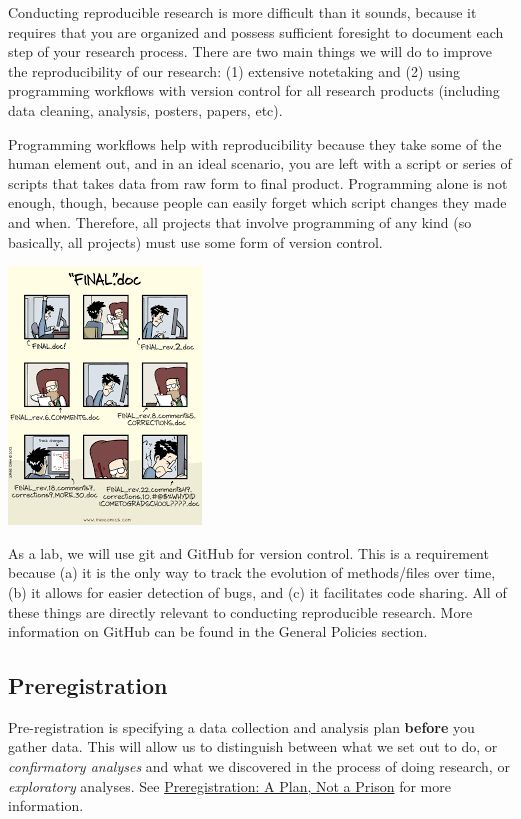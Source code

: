 \documentclass[]{book}
\begin{document}
Conducting reproducible research is more difficult than it sounds, because it requires that you are organized and possess sufficient foresight to document each step of your research process. There are two main things we will do to improve the reproducibility of our research: (1) extensive notetaking and (2) using programming workflows with version control for all research products (including data cleaning, analysis, posters, papers, etc).

Programming workflows help with reproducibility because they take some of the human element out, and in an ideal scenario, you are left with a script or series of scripts that takes data from raw form to final product. Programming alone is not enough, though, because people can easily forget which script changes they made and when. Therefore, all projects that involve programming of any kind (so basically, all projects) must use some form of version control.

\includegraphics{images/final.png}

As a lab, we will use git and GitHub for version control. This is a requirement because (a) it is the only way to track the evolution of methods/files over time, (b) it allows for easier detection of bugs, and (c) it facilitates code sharing. All of these things are directly relevant to conducting reproducible research. More information on GitHub can be found in the General Policies section.

\hypertarget{preregistration}{%
\subsection{Preregistration}\label{preregistration}}

Pre-registration is specifying a data collection and analysis plan \textbf{before} you gather data. This will allow us to distinguish between what we set out to do, or \emph{confirmatory analyses} and what we discovered in the process of doing research, or \emph{exploratory} analyses. See \href{https://cos.io/blog/preregistration-plan-not-prison/}{Preregistration: A Plan, Not a Prison} for more information.
\end{document}
